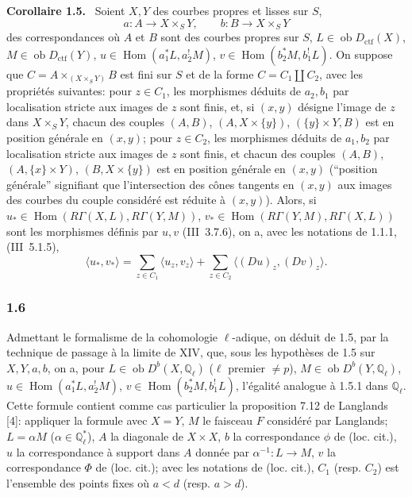 \documentclass[11pt]{article}
\newenvironment{statement}[1]{\par\medskip\noindent\textbf{#1.}\ }{\par\medskip}
\DeclareMathOperator{\Hom}{Hom}
\newcommand{\ob}{\operatorname{ob}}
\providecommand{\ctf}{\mathrm{ctf}}
\providecommand{\Hom}{\operatorname{Hom}}
\providecommand{\ob}{\operatorname{ob}}
\providecommand{\Hom}{\operatorname{Hom}}
\begin{document}
\begin{statement}{Corollaire 1.5}
Soient $X,Y$ des courbes propres et lisses sur $S$,
\[
a:A\longrightarrow X\times_S Y,
\qquad
b:B\longrightarrow X\times_S Y
\]
des correspondances où $A$ et $B$ sont des courbes propres sur $S$, $L\in\ob D_{\ctf}(X)$, $M\in\ob D_{\ctf}(Y)$, $u\in\Hom(a_1^*L,a_2^!M)$, $v\in\Hom(b_2^*M,b_1^!L)$. On suppose que $C=A\times_{(X\times_S Y)}B$ est fini sur $S$ et de la forme $C=C_1\amalg C_2$, avec les propriétés suivantes: pour $z\in C_1$, les morphismes déduits de $a_2,b_1$ par localisation stricte aux images de $z$ sont finis, et, si $(x,y)$ désigne l'image de $z$ dans $X\times_S Y$, chacun des couples $(A,B)$, $(A,X\times\{y\})$, $(\{y\}\times Y,B)$ est en position générale en $(x,y)$; pour $z\in C_2$, les morphismes déduits de $a_1,b_2$ par localisation stricte aux images de $z$ sont finis, et chacun des couples $(A,B)$, $(A,\{x\}\times Y)$, $(B,X\times\{y\})$ est en position générale en $(x,y)$ (``position générale'' signifiant que l'intersection des cônes tangents en $(x,y)$ aux images des courbes du couple considéré est réduite à $(x,y)$). Alors, si $u_*\in\Hom(R\Gamma(X,L),R\Gamma(Y,M))$, $v_*\in\Hom(R\Gamma(Y,M),R\Gamma(X,L))$ sont les morphismes définis par $u,v$ (III~3.7.6), on a, avec les notations de 1.1.1, (III~5.1.5),
\begin{equation}\tag{1.5.1}
\langle u_*,v_*\rangle=\sum_{z\in C_1}\langle u_z,v_z\rangle+\sum_{z\in C_2}\langle (Du)_z,(Dv)_z\rangle.
\end{equation}
\end{statement}

\subsubsection*{1.6}
Admettant le formalisme de la cohomologie $\ell$-adique, on déduit de 1.5, par la technique de passage à la limite de XIV, que, sous les hypothèses de 1.5 sur $X,Y,a,b$, on a, pour $L\in\ob D^b(X,\mathbb Q_\ell)$ ($\ell$ premier $\ne p$), $M\in\ob D^b(Y,\mathbb Q_\ell)$, $u\in\Hom(a_1^*L,a_2^!M)$, $v\in\Hom(b_2^*M,b_1^!L)$, l'égalité analogue à 1.5.1 dans $\mathbb Q_\ell$. Cette formule contient comme cas particulier la proposition 7.12 de Langlands [4]: appliquer la formule avec $X=Y$, $M$ le faisceau $F$ considéré par Langlands; $L=\alpha M$ ($\alpha\in\mathbb Q_\ell^*$), $A$ la diagonale de $X\times X$, $b$ la correspondance $\phi$ de (loc. cit.), $u$ la correspondance à support dans $A$ donnée par $\alpha^{-1}:L\to M$, $v$ la correspondance $\Phi$ de (loc. cit.); avec les notations de (loc. cit.), $C_1$ (resp. $C_2$) est l'ensemble des points fixes où $a<d$ (resp. $a>d$).
\end{document}
